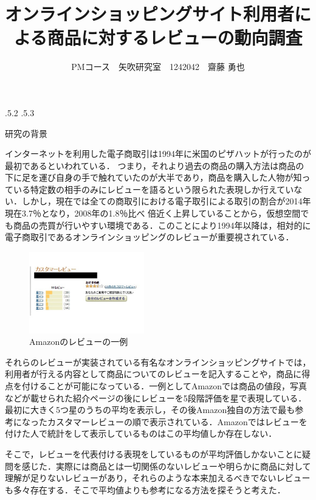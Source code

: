 \documentclass[uplatex]{jsarticle}
\title{\vspace{-14mm}オンラインショッピングサイト利用者による商品に対するレビューの動向調査}
\author{PMコース　矢吹研究室　1242042　齋藤 勇也}
\date{}%
\makeatletter
\renewcommand{\section}{%
    \if@slide\clearpage\fi
    \@startsection{section}{1}{\z@}%
    {\Cvs \@plus.5\Cdp \@minus.2\Cdp}%
    {.5\Cvs \@plus.3\Cdp}%
    {\normalfont\raggedright}}
\makeatother
\begin{document}
\maketitle





\section{研究の背景}

インターネットを利用した電子商取引は1994年に米国のピザハットが行ったのが最初であるといわれている．\cite{sugasaka2003}
つまり，それより過去の商品の購入方法は商品の下に足を運び自身の手で触れていたのが大半であり，商品を購入した人物が知っている特定数の相手のみにレビューを語るという限られた表現しか行えていない．しかし，現在では全ての商取引における電子取引による取引の割合が2014年現在3.7％となり，2008年の1.8％比べ 倍近く上昇していることから，仮想空間でも商品の売買が行いやすい環境である．\cite{keizai2014}このことにより1994年以降は，相対的に電子商取引であるオンラインショッピングのレビューが重要視されている．

\begin{figure}
\vspace*{-\intextsep}
\includegraphics[width=5cm,clip]{customerReview.pdf}
\caption{Amazonのレビューの一例}\label{サンプル図}
\end{figure}

それらのレビューが実装されている有名なオンラインショッピングサイトでは，利用者が行える内容として商品についてのレビューを記入することや，商品に得点を付けることが可能になっている．一例としてAmazonでは商品の値段，写真などが載せられた紹介ページの後にレビューを5段階評価を星で表現している．最初に大きく5つ星のうちの平均を表示し，その後Amazon独自の方法で最も参考になったカスタマーレビューの順で表示されている．Amazonではレビューを付けた人で統計をして表示しているものはこの平均値しか存在しない．

そこで，レビューを代表付ける表現をしているものが平均評価しかないことに疑問を感じた．実際には商品とは一切関係のないレビューや明らかに商品に対して理解が足りないレビューがあり，それらのような本来加えるべきでないレビューも多々存在する．そこで平均値よりも参考になる方法を探そうと考えた．\cite{hattori2011} \cite{yamazawa2006}
\end{document}
